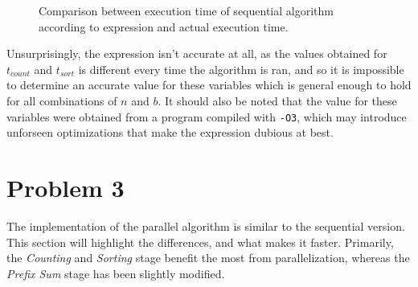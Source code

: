 \documentclass{article}
\begin{document}
\testdata
\begin{figure}[H]
    \begin{center}
    \end{center}
    \caption{Comparison between execution time of sequential algorithm according to expression and actual execution time.}
\end{figure}

Unsurprisingly, the expression isn't accurate at all, as the values obtained for \( t_{count} \) and \( t_{sort} \) is different every time the algorithm is ran, and so it is impossible to determine an accurate value for these variables which is general enough to hold for all combinations of \( n \) and \( b \). It should also be noted that the value for these variables were obtained from a program compiled with \texttt{-O3}, which may introduce unforseen optimizations that make the expression dubious at best.


\section*{Problem 3}

The implementation of the parallel algorithm is similar to the sequential version. This section will highlight the differences, and what makes it faster. Primarily, the \textit{Counting} and \textit{Sorting} stage benefit the most from parallelization, whereas the \textit{Prefix Sum} stage has been slightly modified.
\medskip
\end{document}
